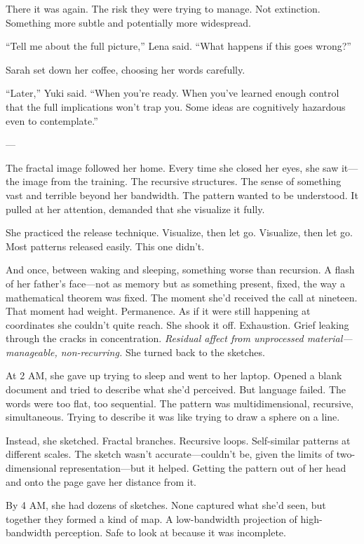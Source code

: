 There it was again. The risk they were trying to manage. Not extinction. Something more subtle and potentially more widespread.

``Tell me about the full picture,'' Lena said. ``What happens if this goes wrong?''

Sarah set down her coffee, choosing her words carefully.

``Later,'' Yuki said. ``When you're ready. When you've learned enough control that the full implications won't trap you. Some ideas are cognitively hazardous even to contemplate.''

---

The fractal image followed her home. Every time she closed her eyes, she saw it—the image from the training. The recursive structures. The sense of something vast and terrible beyond her bandwidth. The pattern wanted to be understood. It pulled at her attention, demanded that she visualize it fully.

She practiced the release technique. Visualize, then let go. Visualize, then let go. Most patterns released easily. This one didn't.

And once, between waking and sleeping, something worse than recursion. A flash of her father's face---not as memory but as something present, fixed, the way a mathematical theorem was fixed. The moment she'd received the call at nineteen. That moment had weight. Permanence. As if it were still happening at coordinates she couldn't quite reach. She shook it off. Exhaustion. Grief leaking through the cracks in concentration. \textit{Residual affect from unprocessed material—manageable, non-recurring.} She turned back to the sketches.

At 2 AM, she gave up trying to sleep and went to her laptop. Opened a blank document and tried to describe what she'd perceived. But language failed. The words were too flat, too sequential. The pattern was multidimensional, recursive, simultaneous. Trying to describe it was like trying to draw a sphere on a line.

Instead, she sketched. Fractal branches. Recursive loops. Self-similar patterns at different scales. The sketch wasn't accurate—couldn't be, given the limits of two-dimensional representation—but it helped. Getting the pattern out of her head and onto the page gave her distance from it.

By 4 AM, she had dozens of sketches. None captured what she'd seen, but together they formed a kind of map. A low-bandwidth projection of high-bandwidth perception. Safe to look at because it was incomplete.

